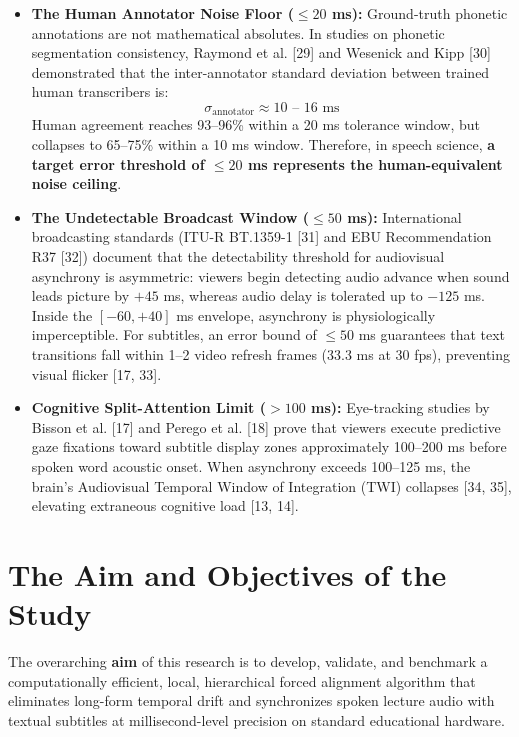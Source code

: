 \documentclass[12pt,a4paper]{article}
\begin{document}
\begin{itemize}
    \item \textbf{The Human Annotator Noise Floor ($\le 20$ ms):} Ground-truth phonetic annotations are not mathematical absolutes. In studies on phonetic segmentation consistency, Raymond et al. [29] and Wesenick and Kipp [30] demonstrated that the inter-annotator standard deviation between trained human transcribers is:
    $$\sigma_{\text{annotator}} \approx 10\text{ -- }16\text{ ms}$$
    Human agreement reaches 93--96\% within a 20 ms tolerance window, but collapses to 65--75\% within a 10 ms window. Therefore, in speech science, \textbf{a target error threshold of $\le 20$ ms represents the human-equivalent noise ceiling}.
    \item \textbf{The Undetectable Broadcast Window ($\le 50$ ms):} International broadcasting standards (ITU-R BT.1359-1 [31] and EBU Recommendation R37 [32]) document that the detectability threshold for audiovisual asynchrony is asymmetric: viewers begin detecting audio advance when sound leads picture by $+45$ ms, whereas audio delay is tolerated up to $-125$ ms. Inside the $[-60, +40]$ ms envelope, asynchrony is physiologically imperceptible. For subtitles, an error bound of $\le 50$ ms guarantees that text transitions fall within 1--2 video refresh frames (33.3 ms at 30 fps), preventing visual flicker [17, 33].
    \item \textbf{Cognitive Split-Attention Limit ($>100$ ms):} Eye-tracking studies by Bisson et al. [17] and Perego et al. [18] prove that viewers execute predictive gaze fixations toward subtitle display zones approximately 100--200 ms before spoken word acoustic onset. When asynchrony exceeds 100--125 ms, the brain's Audiovisual Temporal Window of Integration (TWI) collapses [34, 35], elevating extraneous cognitive load [13, 14].
\end{itemize}

\section{The Aim and Objectives of the Study}
The overarching \textbf{aim} of this research is to develop, validate, and benchmark a computationally efficient, local, hierarchical forced alignment algorithm that eliminates long-form temporal drift and synchronizes spoken lecture audio with textual subtitles at millisecond-level precision on standard educational hardware.
\end{document}
